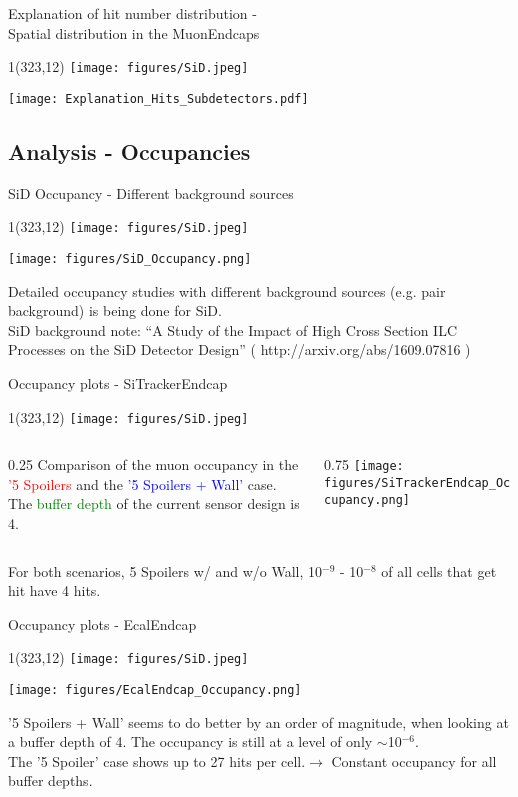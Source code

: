 \documentclass[xcolor={dvipsnames}]{beamer}
\newcommand{\sidlogo}{
  \setlength{\TPHorizModule}{1pt}
  \setlength{\TPVertModule}{1pt}
  \begin{textblock}{1}(323,12)
   \texttt{[image: figures/SiD.jpeg]}
  \end{textblock}
  }
\begin{document}
\begin{frame}{Explanation of hit number distribution -\\ \small Spatial distribution in the MuonEndcaps}
\sidlogo
 \begin{center}
\texttt{[image: Explanation\_Hits\_Subdetectors.pdf]}
\end{center}
\end{frame}

\subsection{Analysis - Occupancies}
\begin{frame}{SiD Occupancy - Different background sources}
\sidlogo
 \begin{center}
\texttt{[image: figures/SiD\_Occupancy.png]}
\end{center}
Detailed occupancy studies with different background sources (e.g. pair background) is being done for SiD.\\
SiD background note: ``A Study of the Impact of High Cross Section ILC Processes on the SiD Detector Design'' \small ( http://arxiv.org/abs/1609.07816 )
\end{frame}
\begin{frame}{Occupancy plots - \small SiTrackerEndcap}
\sidlogo
\begin{columns}
 \begin{column}{0.25\textwidth}
 \small
  Comparison of the muon occupancy in the \textcolor{red}{'5 Spoilers} and the \textcolor{blue}{'5 Spoilers + Wall'} case.\\{\small The \textcolor{green}{buffer depth} of the current sensor design is 4.}
 \end{column}
 \begin{column}{0.75\textwidth}
\texttt{[image: figures/SiTrackerEndcap\_Occupancy.png]}
\end{column}
\end{columns}
For both scenarios, 5 Spoilers w/ and w/o Wall, 10$^{-9}$ - 10$^{-8}$ of all cells that get hit have 4 hits.
\end{frame}
\begin{frame}{Occupancy plots - \small EcalEndcap}
\sidlogo
 \begin{center}
\texttt{[image: figures/EcalEndcap\_Occupancy.png]}
\end{center}
\small '5 Spoilers + Wall' seems to do better by an order of magnitude, when looking at a buffer depth of 4. The occupancy is still at a level of only $\sim$10$^{-6}$.\\
\small The '5 Spoiler' case shows up to 27 hits per cell.$\rightarrow$ Constant occupancy for all buffer depths.
\end{frame}
\end{document}
